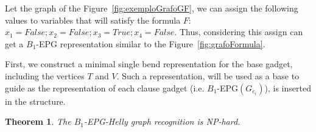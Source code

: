 \documentclass[a4paper,11pt]{article}
\newtheorem{theorem}{Theorem}
\begin{document}


Let the graph of the Figure~\ref{fig:exemploGrafoGF}, we can assign the following values to variables that will satisfy the formula $F$: $x_1 = False; x_2 = False; x_3 = True; x_4 = False$. Thus, considering this assign can get a $B_1$-EPG representation similar to the Figure~\ref{fig:grafoFormula}.



First, we construct a minimal single bend representation for the base gadget, including the vertices $T$ and $V$. Such a representation, will be used as a base to guide as the representation of each clause gadget (i.e. $B_1$-EPG$(G_{c_i})$), is inserted in the structure. %




\begin{theorem}
The $B_{1}$-EPG-Helly graph recognition is NP-hard.
\end{theorem}
\end{document}
